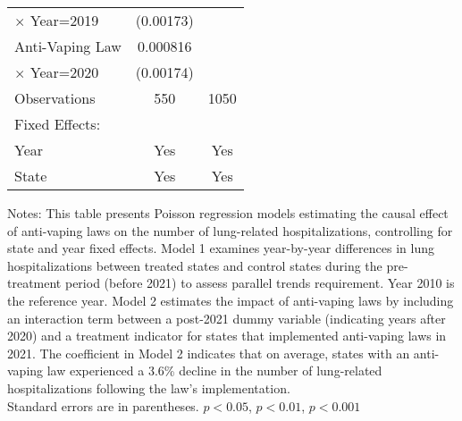 \begin{table}[htbp]
\begin{tabular*}{\hsize}{@{\hskip\tabcolsep\extracolsep\fill}l*{2}{c}}
$\times$ Year=2019  &   (0.00173)         &                     \\
[1em]
Anti-Vaping Law       &    0.000816         &                     \\
$\times$ Year=2020  &   (0.00174)         &                     \\
\hline
Observations        &         550         &        1050         \\
Fixed Effects:      &                     &                     \\
Year                &         Yes         &         Yes         \\
State               &         Yes         &         Yes         \\
\hline\hline

\end{tabular*}
{\parbox{4.8in}{\footnotesize Notes: This table presents Poisson regression models estimating the causal effect of anti-vaping laws on the number of lung-related hospitalizations, controlling for state and year fixed effects. Model 1 examines year-by-year differences in lung hospitalizations between treated states and control states during the pre-treatment period (before 2021) to assess parallel trends requirement. Year 2010 is the reference year. Model 2 estimates the impact of anti-vaping laws by including an interaction term between a post-2021 dummy variable (indicating years after 2020) and a treatment indicator for states that implemented anti-vaping laws in 2021. The coefficient in Model 2 indicates that on average, states with an anti-vaping law experienced a 3.6\% decline in the number of lung-related hospitalizations following the law's implementation.\\Standard errors are in parentheses. \sym{*} \(p<0.05\), \sym{**} \(p<0.01\), \sym{***} \(p<0.001\)
}}
\end{table}
